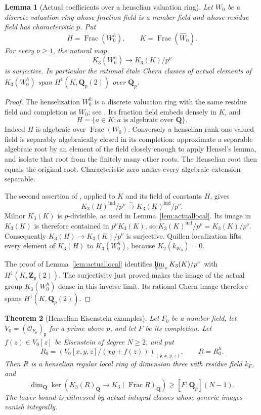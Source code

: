 \documentclass[11pt,a4paper]{article}
\newtheorem{theorem}{Theorem}[section]
\newtheorem{lemma}[theorem]{Lemma}
\theoremstyle{remark}
\newcommand{\Q}{\mathbf Q}
\newcommand{\Z}{\mathbf Z}
\newcommand{\OO}{\mathcal O}
\newcommand{\Frac}{\operatorname{Frac}}
\begin{document}
\begin{lemma}[Actual coefficients over a henselian valuation ring]
\label{lem:henseliancoefficients}
Let $W_0$ be a discrete valuation ring whose fraction field is a number
field and whose residue field has characteristic $p$.  Put
\[
H=\Frac(W_0^h),\qquad K=\Frac(\widehat W_0).
\]
For every $\nu\geq1$, the natural map
\[
K_3(W_0^h)\longrightarrow K_3(K)/p^\nu
\]
is surjective.  In particular the rational \'etale Chern classes of
actual elements of $K_3(W_0^h)$ span $H^1(K,\Q_p(2))$ over $\Q_p$.
\end{lemma}

\begin{proof}
The henselization $W_0^h$ is a discrete valuation ring with the same
residue field and completion as $W_0$; see
\cite[Section~15.46, Lemmas~15.46.1, 15.46.3 and 15.46.11]{StacksHenselization}.
Its fraction field embeds densely in $K$, and
\[
H=\{a\in K:a\text{ is algebraic over }\Q\}.
\]
Indeed $H$ is algebraic over $\Frac(W_0)$.  Conversely a henselian
rank-one valued field is separably algebraically closed in its completion:
approximate a separable algebraic root by an element of the field closely
enough to apply Hensel's lemma, and isolate that root from the finitely
many other roots.  The Henselian root then equals the original root.
Characteristic zero makes every algebraic extension separable.

The second assertion of \cite[Theorem~4.13, p.~336]{LevineIndK3},
applied to $K$ and its field of constants $H$, gives
\[
K_3(H)^{\mathrm{ind}}/p^\nu
\xrightarrow{\sim}K_3(K)^{\mathrm{ind}}/p^\nu.
\]
Milnor $K_3(K)$ is $p$-divisible, as used in
Lemma~\ref{lem:actuallocal}.  Its image in $K_3(K)$ is therefore
contained in $p^\nu K_3(K)$, so
$K_3(K)^{\mathrm{ind}}/p^\nu=K_3(K)/p^\nu$.
Consequently $K_3(H)\to K_3(K)/p^\nu$ is surjective.
Quillen localization lifts every element of $K_3(H)$ to $K_3(W_0^h)$,
because $K_2(k_{W_0})=0$.

The proof of Lemma~\ref{lem:actuallocal} identifies
$\varprojlim_\nu K_3(K)/p^\nu$ with $H^1(K,\Z_p(2))$.
The surjectivity just proved makes the image of the actual group
$K_3(W_0^h)$ dense in this inverse limit.  Its rational Chern image
therefore spans $H^1(K,\Q_p(2))$.
\end{proof}

\begin{theorem}[Henselian Eisenstein examples]
\label{thm:henselianeisensteinrank}
Let $F_0$ be a number field, let $V_0=(\OO_{F_0})_{\mathfrak p}$ for a
prime above $p$, and let $F$ be its completion.  Let $f(z)\in V_0[z]$
be Eisenstein of degree $N\geq2$, and put
\[
R_0=\left(V_0[x,y,z]/(xy+f(z))\right)_{(\mathfrak p,x,y,z)},
\qquad R=R_0^h.
\]
Then $R$ is a henselian regular local ring of dimension three with
residue field $k_F$, and
\[
\dim_{\Q}\ker\left(K_3(R)_{\Q}\longrightarrow
K_3(\Frac R)_{\Q}\right)\geq [F:\Q_p](N-1).
\]
The lower bound is witnessed by actual integral classes whose generic
images vanish integrally.
\end{theorem}
\end{document}
